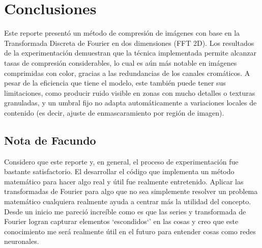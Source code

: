 \section{Conclusiones}

Este reporte presentó un método de compresión de imágenes con base en la Transformada Discreta de Fourier en dos dimensiones (FFT 2D). Los resultados de la experimentación demuestran que la técnica implementada permite alcanzar tasas de compresión considerables, lo cual es aún más notable en imágenes comprimidas con color, gracias a las redundancias de los canales cromáticos. A pesar de la eficiencia que tiene el modelo, este también puede tener sus limitaciones, como producir ruido visible en zonas con mucho detalles o texturas granuladas, y un umbral fijo no adapta automáticamente a variaciones locales de contenido (es decir, ajuste de enmascaramiento por región de imagen).

\subsection{Nota de Facundo}

Considero que este reporte y, en general, el proceso de experimentación fue bastante satisfactorio.
El desarrollar el código que implementa un método matemático para hacer algo real y útil fue realmente entretenido. Aplicar las transformadas de Fourier para algo que no sea simplemente resolver un problema matemático cualquiera realmente ayuda a centrar más la utilidad del concepto. Desde un inicio me pareció increíble como es que las series y transformada de Fourier logran capturar elementos `escondidos`' en las cosas y creo que este conocimiento me será realmente útil en el futuro para entender cosas como redes neuronales.